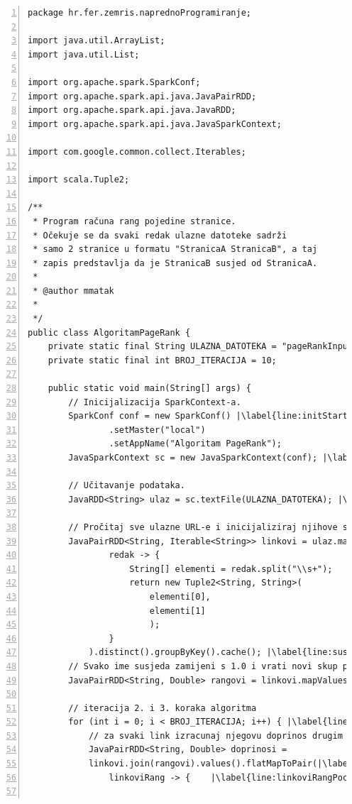 \documentclass[times, utf8, zavrsni, numeric]{fer}
\begin{document}
\vspace{5mm}
\begin{lstlisting}[numbers=left, label={lst:pagerank}, caption={Algoritam \emph{PageRank}.}, escapechar=|]
package hr.fer.zemris.naprednoProgramiranje;

import java.util.ArrayList;
import java.util.List;

import org.apache.spark.SparkConf;
import org.apache.spark.api.java.JavaPairRDD;
import org.apache.spark.api.java.JavaRDD;
import org.apache.spark.api.java.JavaSparkContext;

import com.google.common.collect.Iterables;

import scala.Tuple2;

/**
 * Program računa rang pojedine stranice. 
 * Očekuje se da svaki redak ulazne datoteke sadrži 
 * samo 2 stranice u formatu "StranicaA StranicaB", a taj
 * zapis predstavlja da je StranicaB susjed od StranicaA.
 * 
 * @author mmatak
 *
 */
public class AlgoritamPageRank {
	private static final String ULAZNA_DATOTEKA = "pageRankInput.txt";
	private static final int BROJ_ITERACIJA = 10;

	public static void main(String[] args) {
		// Inicijalizacija SparkContext-a.
		SparkConf conf = new SparkConf() |\label{line:initStart}|
				.setMaster("local") 
				.setAppName("Algoritam PageRank");
		JavaSparkContext sc = new JavaSparkContext(conf); |\label{line:initEnd}|

		// Učitavanje podataka.
		JavaRDD<String> ulaz = sc.textFile(ULAZNA_DATOTEKA); |\label{line:ucitavanje}|

		// Pročitaj sve ulazne URL-e i inicijaliziraj njihove susjede.
		JavaPairRDD<String, Iterable<String>> linkovi = ulaz.mapToPair(|\label{line:susjediInitStart}|
				redak -> {
					String[] elementi = redak.split("\\s+");
					return new Tuple2<String, String>(
						elementi[0],
						elementi[1]
						);
				}
			).distinct().groupByKey().cache(); |\label{line:susjediInitEnd}|
		// Svako ime susjeda zamijeni s 1.0 i vrati novi skup podataka.
		JavaPairRDD<String, Double> rangovi = linkovi.mapValues(value -> 1.0); |\label{line:initRangovi}|

		// iteracija 2. i 3. koraka algoritma
		for (int i = 0; i < BROJ_ITERACIJA; i++) { |\label{line:brIteracijaStart}|
			// za svaki link izracunaj njegovu doprinos drugim linkovima
			JavaPairRDD<String, Double> doprinosi =
			linkovi.join(rangovi).values().flatMapToPair(|\label{line:joinValues}|
				linkoviRang -> { 	|\label{line:linkoviRangPocetak}|
			

\end{lstlisting}
\end{document}
